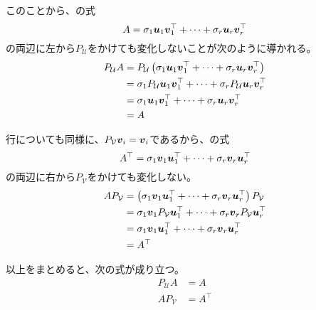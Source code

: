 \documentclass[../../../topic_linear-algebra]{subfiles}
\begin{document}
このことから、の式
\begin{equation*}
  A = \sigma_1\vb*{u}_1\vb*{v}_1^\top + \cdots + \sigma_r \vb*{u}_r \vb*{v}_r^\top
\end{equation*}
の両辺に左から$P_{\mathcal{U}}$をかけても変化しないことが次のように導かれる。
\begin{align*}
  P_{\mathcal{U}} A & = P_{\mathcal{U}} \left( \sigma_1\vb*{u}_1\vb*{v}_1^\top + \cdots + \sigma_r \vb*{u}_r \vb*{v}_r^\top \right)   \\
                    & = \sigma_1 P_{\mathcal{U}} \vb*{u}_1\vb*{v}_1^\top + \cdots + \sigma_r P_{\mathcal{U}} \vb*{u}_r \vb*{v}_r^\top \\
                    & = \sigma_1 \vb*{u}_1\vb*{v}_1^\top + \cdots + \sigma_r \vb*{u}_r \vb*{v}_r^\top                                 \\
                    & = A
\end{align*}

\br

行についても同様に、$P_{\mathcal{V}}\vb*{v}_i = \vb*{v}_i$であるから、の式
\begin{equation*}
  A^\top = \sigma_1\vb*{v}_1\vb*{u}_1^\top + \cdots + \sigma_r \vb*{v}_r \vb*{u}_r^\top
\end{equation*}
の両辺に右から$P_{\mathcal{V}}$をかけても変化しない。
\begin{align*}
  A P_{\mathcal{V}} & = \left( \sigma_1\vb*{v}_1\vb*{u}_1^\top + \cdots + \sigma_r \vb*{v}_r \vb*{u}_r^\top \right) P_{\mathcal{V}}    \\
                    & = \sigma_1 \vb*{v}_1 P_{\mathcal{V}} \vb*{u}_1^\top + \cdots + \sigma_r \vb*{v}_r P_{\mathcal{V}} \vb*{u}_r^\top \\
                    & = \sigma_1 \vb*{v}_1\vb*{u}_1^\top + \cdots + \sigma_r \vb*{v}_r \vb*{u}_r^\top                                  \\
                    & = A^\top
\end{align*}

\br

以上をまとめると、次の式が成り立つ。
\begin{align*}
  P_{\mathcal{U}} A & = A      \\
  A P_{\mathcal{V}} & = A^\top
\end{align*}
\end{document}
